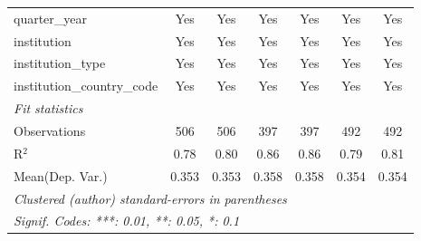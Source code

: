 \begin{tabular}{lcccccc}
   quarter\_year                      & Yes     & Yes     & Yes    & Yes     & Yes     & Yes\\  
   institution                        & Yes     & Yes     & Yes    & Yes     & Yes     & Yes\\  
   institution\_type                  & Yes     & Yes     & Yes    & Yes     & Yes     & Yes\\  
   institution\_country\_code         & Yes     & Yes     & Yes    & Yes     & Yes     & Yes\\  
   \midrule
   \emph{Fit statistics}\\
   Observations                       & 506     & 506     & 397    & 397     & 492     & 492\\  
   R$^2$                              & 0.78    & 0.80    & 0.86   & 0.86    & 0.79    & 0.81\\  
Mean(Dep. Var.) & 0.353 & 0.353 & 0.358 & 0.358 & 0.354 & 0.354 \\
   \midrule \midrule
   \multicolumn{7}{l}{\emph{Clustered (author) standard-errors in parentheses}}\\
   \multicolumn{7}{l}{\emph{Signif. Codes: ***: 0.01, **: 0.05, *: 0.1}}\\
\end{tabular}
\par\endgroup
